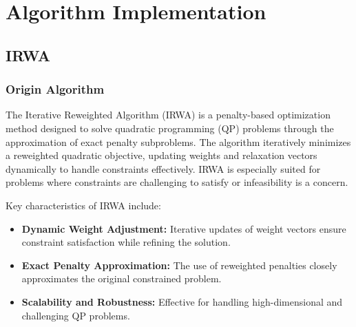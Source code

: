 \documentclass{article}
\begin{document}

\section{Algorithm Implementation}
\subsection{IRWA}
\subsubsection{Origin Algorithm}
The Iterative Reweighted Algorithm (IRWA) is a penalty-based optimization method designed to solve quadratic programming (QP) problems through the approximation of exact penalty subproblems. The algorithm iteratively minimizes a reweighted quadratic objective, updating weights and relaxation vectors dynamically to handle constraints effectively. IRWA is especially suited for problems where constraints are challenging to satisfy or infeasibility is a concern.

Key characteristics of IRWA include:
\begin{itemize}
    \item \textbf{Dynamic Weight Adjustment:} Iterative updates of weight vectors ensure constraint satisfaction while refining the solution.
    \item \textbf{Exact Penalty Approximation:} The use of reweighted penalties closely approximates the original constrained problem.
    \item \textbf{Scalability and Robustness:} Effective for handling high-dimensional and challenging QP problems.
\end{itemize}
\end{document}
